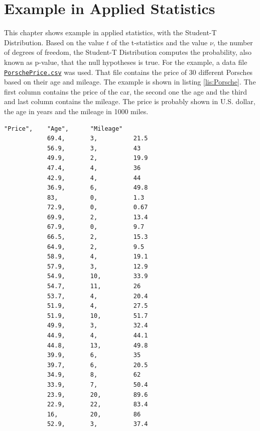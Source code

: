 
\chapter{Example in Applied Statistics}


	This chapter shows example in applied statistics, with the Student-T Distribution. Based on the value $t$ of the t-statistics and the value $\nu$, the number of degrees of freedom, the Student-T Distribution computes the probability, also known as p-value, that the null hypotheses is true. For the example, a data file \href{https://vincentarelbundock.github.io/Rdatasets/csv/Stat2Data/PorschePrice.csv}{\lstinline{PorschePrice.csv}} was used. That file contains the price of 30 different Porsches based on their age and mileage. The example is shown in listing \ref{lis:Porsche}. The first column contains the price of the car, the second one the age and the third and last column contains the mileage. The price is probably shown in U.S. dollar, the age in years and the mileage in 1000 miles.

	\begin{center}
		\begin{lstlisting}[caption={\lstinline{PorschePrice.csv} Example}, label={lis:Porsche}]
			"Price",	"Age",		"Mileage"
			69.4,		3,			21.5
			56.9,		3,			43
			49.9,		2,			19.9
			47.4,		4,			36
			42.9,		4,			44
			36.9,		6,			49.8
			83,			0,			1.3
			72.9,		0,			0.67
			69.9,		2,			13.4
			67.9,		0,			9.7
			66.5,		2,			15.3
			64.9,		2,			9.5
			58.9,		4,			19.1
			57.9,		3,			12.9
			54.9,		10,			33.9
			54.7,		11,			26
			53.7,		4,			20.4
			51.9,		4,			27.5
			51.9,		10,			51.7
			49.9,		3,			32.4
			44.9,		4,			44.1
			44.8,		13,			49.8
			39.9,		6,			35
			39.7,		6,			20.5
			34.9,		8,			62
			33.9,		7,			50.4
			23.9,		20,			89.6
			22.9,		22,			83.4
			16,			20,			86
			52.9,		3,			37.4
		\end{lstlisting}
	\end{center}

